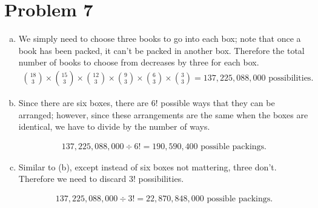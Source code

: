 \documentclass[11pt]{article}
\begin{document}
\section*{Problem 7}
	\begin{enumerate}[(a)]
		\item
		We simply need to choose three books to go into each box; note that once a book has been packed, it can't be packed in another box. Therefore 
		the total number of books to choose from decreases by three for each box.
		\begin{align*}
		\binom{18}{3} \times \binom{15}{3} \times \binom{12}{3} \times \binom{9}{3} \times \binom{6}{3} \times \binom{3}{3} = 137,225,088,000 \text{ 
		possibilities.}
		\end{align*}	
		
		\item
		Since there are six boxes, there are $6!$ possible ways that they can be arranged; however, since these arrangements are the same when the 
		boxes are identical, we have to divide by the number of ways.
		
		\begin{align*}
		137,225,088,000 \div 6! = 190,590,400 \text{ possible packings.}
		\end{align*}			
	
		\item
		Similar to (b), except instead of six boxes not mattering, three don't. Therefore we need to discard $3!$ possibilities.
		
		\begin{align*}
		137,225,088,000 \div 3! = 22,870,848,000 \text{ possible packings.}
		\end{align*}
	
	\end{enumerate}
\end{document}
